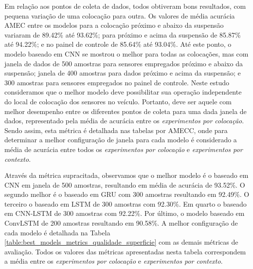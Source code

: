 Em relação aos pontos de coleta de dados, todos obtiveram bons resultados, com pequena variação de uma colocação para outra. Os valores de média acurácia AMEC entre os modelos para a colocação próximo e abaixo da suspensão variaram de 89.42\% até 93.62\%; para próximo e acima da suspensão de 85.87\% até 94.22\%; e no painel de controle de 85.64\% até 93.04\%. Até este ponto, o modelo baseado em CNN se mostrou o melhor para todas as colocações, mas com janela de dados de 500 amostras para sensores empregados próximo e abaixo da suspensão; janela de 400 amostras para dados próximo e acima da suspensão; e 300 amostras para sensores empregados no painel de controle. Neste estudo consideramos que o melhor modelo deve possibilitar sua operação independente do local de colocação dos sensores no veículo. Portanto, deve ser aquele com melhor desempenho entre os diferentes pontos de coleta para uma dada janela de dados, representado pela média de acurácia entre os \emph{experimentos por colocação}. Sendo assim, esta métrica é detalhada nas tabelas por AMECC, onde para determinar a melhor configuração de janela para cada modelo é considerado a média de acurácia entre todos os \emph{experimentos por colocação} e \emph{experimentos por contexto}.

Através da métrica supracitada, observamos que o melhor modelo é o baseado em CNN em janela de 500 amostras, resultando em média de acurácia de 93.52\%. O segundo melhor é o baseado em GRU com 300 amostras resultando em 92.49\%. O terceiro o baseado em LSTM de 300 amostras com 92.30\%. Em quarto o baseado em CNN-LSTM de 300 amostras com 92.22\%. Por último, o modelo baseado em ConvLSTM de 200 amostras resultando em 90.58\%. A melhor configuração de cada modelo é detalhada na Tabela \ref{table:best_models_metrics_qualidade_superficie} com as demais métricas de avaliação. Todos os valores das métricas apresentadas nesta tabela correspondem a média entre os \emph{experimentos por colocação} e \emph{experimentos por contexto}.

